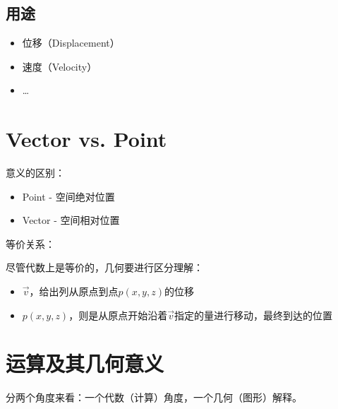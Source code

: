 \documentclass[11pt,a4paper]{report}
\begin{document}
\subsection{用途}

\begin{itemize}
\item 位移（Displacement）
\item 速度（Velocity）
\item \ldots
\end{itemize}


\section{Vector vs.  Point}

意义的区别：

\begin{itemize}
\item Point - 空间绝对位置
\item Vector - 空间相对位置
\end{itemize}


等价关系：

\begin{center}
\end{center}


尽管代数上是等价的，几何要进行区分理解：

\begin{itemize}
\item  $\vec{v}$，给出列从原点到点$p(x,y,z)$的位移
\item  $p(x,y,z)$，则是从原点开始沿着$\vec{v}$指定的量进行移动，最终到达的位置
\end{itemize}


\section{运算及其几何意义}

分两个角度来看：一个代数（计算）角度，一个几何（图形）解释。
\end{document}
